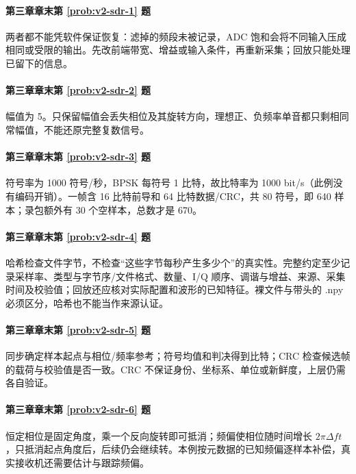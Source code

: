 \paragraph*{第三章章末第 \ref{prob:v2-sdr-1} 题}
\begin{solution}
两者都不能凭软件保证恢复：滤掉的频段未被记录，ADC 饱和会将不同输入压成相同或受限的输出。先改前端带宽、增益或输入条件，再重新采集；回放只能处理已留下的信息。
\end{solution}
\paragraph*{第三章章末第 \ref{prob:v2-sdr-2} 题}
\begin{solution}
幅值为 5。只保留幅值会丢失相位及其旋转方向，理想正、负频率单音都只剩相同常幅值，不能还原完整复数信号。
\end{solution}
\paragraph*{第三章章末第 \ref{prob:v2-sdr-3} 题}
\begin{solution}
符号率为 1000 符号/秒，BPSK 每符号 1 比特，故比特率为 1000 bit/s（此例没有编码开销）。一帧含 16 比特前导和 64 比特数据/CRC，共 80 符号，即 640 样本；录包额外有 30 个空样本，总数才是 670。
\end{solution}
\paragraph*{第三章章末第 \ref{prob:v2-sdr-4} 题}
\begin{solution}
哈希检查文件字节，不检查“这些字节每秒产生多少个”的真实性。完整约定至少记录采样率、类型与字节序/文件格式、数量、I/Q 顺序、调谐与增益、来源、采集时间及校验值；回放还应核对实际配置和波形的已知特征。裸文件与带头的 .npy 必须区分，哈希也不能当作来源认证。
\end{solution}
\paragraph*{第三章章末第 \ref{prob:v2-sdr-5} 题}
\begin{solution}
同步确定样本起点与相位/频率参考；符号均值和判决得到比特；CRC 检查候选帧的载荷与校验值是否一致。CRC 不保证身份、坐标系、单位或新鲜度，上层仍需各自验证。
\end{solution}
\paragraph*{第三章章末第 \ref{prob:v2-sdr-6} 题}
\begin{solution}
恒定相位是固定角度，乘一个反向旋转即可抵消；频偏使相位随时间增长 $2\pi\Delta f t$，只抵消起点角度后，后续仍会继续转。本例按元数据的已知频偏逐样本补偿，真实接收机还需要估计与跟踪频偏。
\end{solution}

